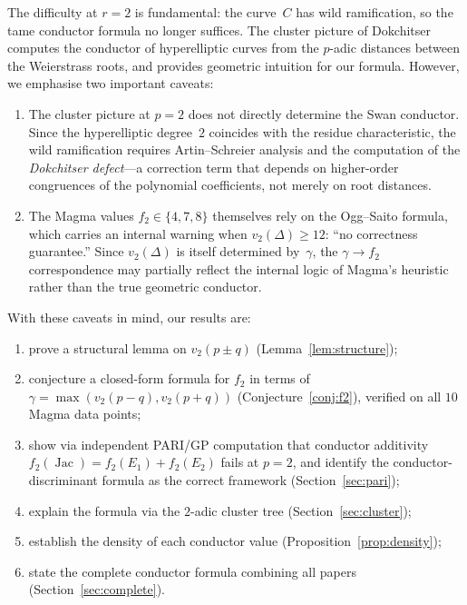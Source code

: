 \documentclass[11pt,a4paper]{article}
\newcommand{\Jac}{\operatorname{Jac}}
\theoremstyle{definition}
\theoremstyle{remark}
\begin{document}
The difficulty at $r = 2$ is fundamental: the curve~$C$
has wild ramification, so the tame conductor formula no
longer suffices.  The cluster picture
of Dokchitser~\cite{Dokchitser} computes the
conductor of hyperelliptic curves from the $p$-adic
distances between the Weierstrass roots, and provides
geometric intuition for our formula.  However, we
emphasise two important caveats:

\begin{enumerate}
\item[(a)] The cluster picture at $p = 2$ does not
  directly determine the Swan conductor.  Since the
  hyperelliptic degree~$2$ coincides with the residue
  characteristic, the wild ramification requires
  Artin--Schreier analysis and the computation of
  the \emph{Dokchitser defect}---a correction term
  that depends on higher-order congruences of the
  polynomial coefficients, not merely on root distances.
\item[(b)] The Magma values $f_2 \in \{4, 7, 8\}$
  themselves rely on the Ogg--Saito formula, which
  carries an internal warning when
  $v_2(\Delta) \ge 12$: ``no correctness guarantee.''
  Since $v_2(\Delta)$ is itself determined by~$\gamma$,
  the $\gamma \to f_2$ correspondence may partially
  reflect the internal logic of Magma's heuristic
  rather than the true geometric conductor.
\end{enumerate}

\noindent
With these caveats in mind, our results are:
\begin{enumerate}
\item prove a structural lemma on $v_2(p \pm q)$
  (Lemma~\ref{lem:structure});
\item conjecture a closed-form formula for $f_2$
  in terms of
  $\gamma = \max(v_2(p{-}q), v_2(p{+}q))$
  (Conjecture~\ref{conj:f2}), verified on all
  $10$ Magma data points;
\item show via independent PARI/GP computation that
  conductor additivity $f_2(\Jac) = f_2(E_1) + f_2(E_2)$
  fails at $p = 2$, and identify the
  conductor-discriminant formula as the correct
  framework (Section~\ref{sec:pari});
\item explain the formula via the $2$-adic cluster tree
  (Section~\ref{sec:cluster});
\item establish the density of each conductor value
  (Proposition~\ref{prop:density});
\item state the complete conductor formula combining
  all papers (Section~\ref{sec:complete}).
\end{enumerate}
\end{document}
